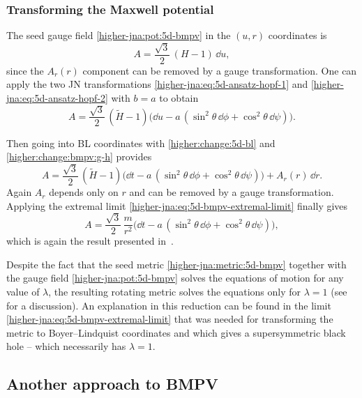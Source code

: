 \subsubsection{Transforming the Maxwell potential}


The seed gauge field \eqref{higher-jna:pot:5d-bmpv} in the $(u, r)$ coordinates is
\begin{equation}
	A = \frac{\sqrt{3}}{2}\, (H - 1)\, \dd u,
\end{equation} 
since the $A_r(r)$ component can be removed by a gauge transformation.
One can apply the two JN transformations \eqref{higher-jna:eq:5d-ansatz-hopf-1} and \eqref{higher-jna:eq:5d-ansatz-hopf-2} with $b = a$ to obtain
\begin{equation}
	A = \frac{\sqrt{3}}{2}\, (\tilde H - 1) \Big( \dd u - a\, (\sin^2 \theta\, \dd\phi + \cos^2 \theta\, \dd\psi) \Big).
\end{equation} 

Then going into BL coordinates with \eqref{higher:change:5d-bl} and \eqref{higher:change:bmpv:g-h} provides
\begin{equation}
	A = \frac{\sqrt{3}}{2}\, (\tilde H - 1) \Big( \dd t - a\, (\sin^2 \theta\, \dd\phi + \cos^2 \theta\, \dd\psi) \Big) + A_r(r)\, \dd r.
\end{equation} 
Again $A_r$ depends only on $r$ and can be removed by a gauge transformation.
Applying the extremal limit \eqref{higher-jna:eq:5d-bmpv-extremal-limit} finally gives
\begin{equation}
	A = \frac{\sqrt{3}}{2}\, \frac{m}{r^2} \Big( \dd t - a\, (\sin^2 \theta\, \dd\phi + \cos^2 \theta\, \dd\psi) \Big),
\end{equation}
which is again the result presented in~\cite[p. 5]{Breckenridge:1997:DbranesSpinningBlack}.

Despite the fact that the seed metric \eqref{higher-jna:metric:5d-bmpv} together with the gauge field \eqref{higher-jna:pot:5d-bmpv} solves the equations of motion for any value of $\lambda$, the resulting rotating metric solves the equations only for $\lambda = 1$ (see~\cite[sec.~7]{Gauntlett:1999:BlackHolesD5} for a discussion).
An explanation in this reduction can be found in the limit \eqref{higher-jna:eq:5d-bmpv-extremal-limit} that was needed for transforming the metric to Boyer--Lindquist coordinates and which gives a supersymmetric black hole -- which necessarily has $\lambda = 1$.



\subsection{Another approach to BMPV}
\label{sec:higher-jna:5d:bmpv-second-approach}


